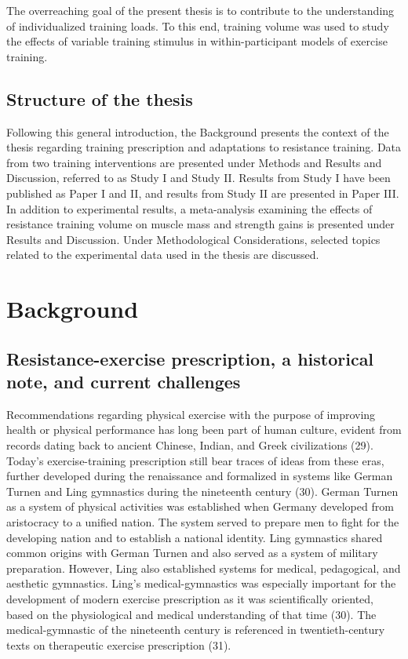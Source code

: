 \documentclass[twoside,10pt]{gihclass} %
\begin{document}
The overreaching goal of the present thesis is to contribute to the understanding of individualized training loads. To this end, training volume was used to study the effects of variable training stimulus in within-participant models of exercise training.

\hypertarget{structure-of-the-thesis}{%
\section{Structure of the thesis}\label{structure-of-the-thesis}}

Following this general introduction, the Background presents the context of the thesis regarding training prescription and adaptations to resistance training. Data from two training interventions are presented under Methods and Results and Discussion, referred to as Study I and Study II. Results from Study I have been published as Paper I and II, and results from Study II are presented in Paper III. In addition to experimental results, a meta-analysis examining the effects of resistance training volume on muscle mass and strength gains is presented under Results and Discussion. Under Methodological Considerations, selected topics related to the experimental data used in the thesis are discussed.

\hypertarget{background}{%
\chapter{Background}\label{background}}

\hypertarget{resistance-exercise-prescription-a-historical-note-and-current-challenges}{%
\section{Resistance-exercise prescription, a historical note, and current challenges}\label{resistance-exercise-prescription-a-historical-note-and-current-challenges}}

Recommendations regarding physical exercise with the purpose of improving health or physical performance has long been part of human culture, evident from records dating back to ancient Chinese, Indian, and Greek civilizations
(29).
Today's exercise-training prescription still bear traces of ideas from these eras, further developed during the renaissance and formalized in systems like German Turnen and Ling gymnastics during the nineteenth century
(30).
German Turnen as a system of physical activities was established when Germany developed from aristocracy to a unified nation.
The system served to prepare men to fight for the developing nation and to establish a national identity.
Ling gymnastics shared common origins with German Turnen and also served as a system of military preparation.
However, Ling also established systems for medical, pedagogical, and aesthetic gymnastics.
Ling's medical-gymnastics was especially important for the development of modern exercise prescription as it was scientifically oriented, based on the physiological and medical understanding of that time (30).
The medical-gymnastic of the nineteenth century is referenced in twentieth-century texts on therapeutic exercise prescription
(31).
\end{document}
